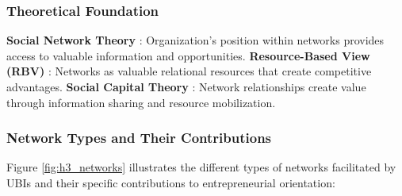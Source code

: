 \documentclass[../Main.tex]{subfiles}
\begin{document}
    \subsubsection{Theoretical Foundation}
    \textbf{Social Network Theory} \autocite{granovetter1973strength}: Organization's position within networks provides access to valuable information and opportunities. 
    \textbf{Resource-Based View (RBV)} \autocite{barney1991firm}: Networks as valuable relational resources that create competitive advantages. 
    \textbf{Social Capital Theory} \autocite{coleman1988social}: Network relationships create value through information sharing and resource mobilization.

    \subsubsection{Network Types and Their Contributions}
    Figure \ref{fig:h3_networks} illustrates the different types of networks facilitated by UBIs and their specific contributions to entrepreneurial orientation:
\end{document}
